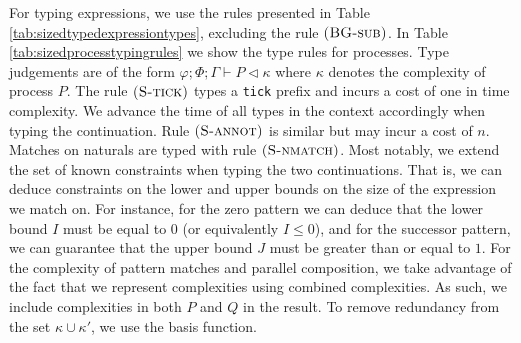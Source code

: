 %
For typing expressions, we use the rules presented in Table \ref{tab:sizedtypedexpressiontypes}, excluding the rule $\mbox{\textsc{\protect{(BG-sub})}}$. In Table \ref{tab:sizedprocesstypingrules} we show the type rules for processes. Type judgements are of the form $\varphi;\Phi;\Gamma \vdash P \triangleleft \kappa$ where $\kappa$ denotes the complexity of process $P$. The rule $\mbox{\textsc{\protect{(S-tick})}}$ types a \texttt{tick} prefix and incurs a cost of one in time complexity. We advance the time of all types in the context accordingly when typing the continuation. Rule $\mbox{\textsc{\protect{(S-annot})}}$ is similar but may incur a cost of $n$. Matches on naturals are typed with rule $\mbox{\textsc{\protect{(S-nmatch})}}$. Most notably, we extend the set of known constraints when typing the two continuations. That is, we can deduce constraints on the lower and upper bounds on the size of the expression we match on. For instance, for the zero pattern we can deduce that the lower bound $I$ must be equal to $0$ (or equivalently $I \leq 0$), and for the successor pattern, we can guarantee that the upper bound $J$ must be greater than or equal to $1$. For the complexity of pattern matches and parallel composition, we take advantage of the fact that we represent complexities using combined complexities. As such, we include complexities in both $P$ and $Q$ in the result. To remove redundancy from the set $\kappa \cup \kappa'$, we use the basis function.\\


